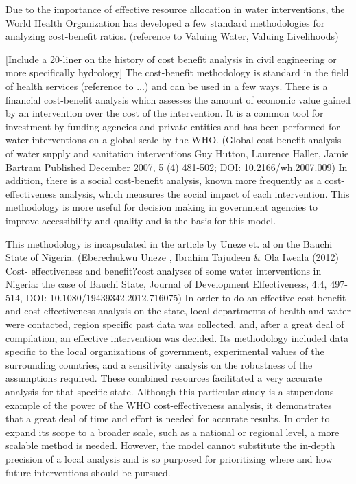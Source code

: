 Due to the importance of effective resource allocation in water interventions, the World Health Organization has developed a few standard methodologies for analyzing cost-benefit ratios. (reference to Valuing Water, Valuing Livelihoods)

[Include a 20-liner on the history of cost benefit analysis in civil engineering or more specifically hydrology]
The cost-benefit methodology is standard in the field of health services (reference to ...) and can be used in a few ways.
There is a financial cost-benefit analysis which assesses the amount of economic value gained by an intervention over the cost of the intervention.
It is a common tool for investment by funding agencies and private entities and has been performed for water interventions on a global scale by the WHO. (Global cost-benefit analysis of water supply and sanitation interventions Guy Hutton, Laurence Haller, Jamie Bartram Published December 2007, 5 (4) 481-502; DOI: 10.2166/wh.2007.009)
In addition, there is a social cost-benefit analysis, known more frequently as a cost-effectiveness analysis, which measures the social impact of each intervention.
This methodology is more useful for decision making in government agencies to improve accessibility and quality and is the basis for this model.

This methodology is incapsulated in the article by Uneze et. al on the Bauchi State of Nigeria. (Eberechukwu Uneze , Ibrahim Tajudeen \& Ola Iweala (2012) Cost- effectiveness and benefit?cost analyses of some water interventions in Nigeria: the case of Bauchi State, Journal of Development Effectiveness, 4:4, 497-514, DOI: 10.1080/19439342.2012.716075)
In order to do an effective cost-benefit and cost-effectiveness analysis on the state, local departments of health and water were contacted, region specific past data was collected, and, after a great deal of compilation, an effective intervention was decided.
Its methodology included data specific to the local organizations of government, experimental values of the surrounding countries, and a sensitivity analysis on the robustness of the assumptions required.
These combined resources facilitated a very accurate analysis for that specific state.
Although this particular study is a stupendous example of the power of the WHO cost-effectiveness analysis, it demonstrates that a great deal of time and effort is needed for accurate results.
In order to expand its scope to a broader scale, such as a national or regional level, a more scalable method is needed.
However, the model cannot substitute the in-depth precision of a local analysis and is so purposed for prioritizing where and how future interventions should be pursued.

